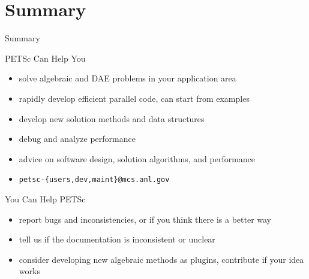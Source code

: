 %
% 


%



%
%
%





%




\section{Summary}
\begin{frame}{Summary}
 
 \begin{block}{PETSc Can Help You}
  \begin{itemize}
   \item solve algebraic and DAE problems in your application area
   \item rapidly develop efficient parallel code, can start from examples
   \item develop new solution methods and data structures
   \item debug and analyze performance
   \item advice on software design, solution algorithms, and performance
   \item \centering \texttt{petsc-\{users,dev,maint\}@mcs.anl.gov}

  \end{itemize}
 \end{block}

 \begin{block}{You Can Help PETSc}
  \begin{itemize}
   \item report bugs and inconsistencies, or if you think there is a better way
   \item tell us if the documentation is inconsistent or unclear
   \item consider developing new algebraic methods as plugins, contribute if your idea works
  \end{itemize}
 \end{block}

\end{frame}
